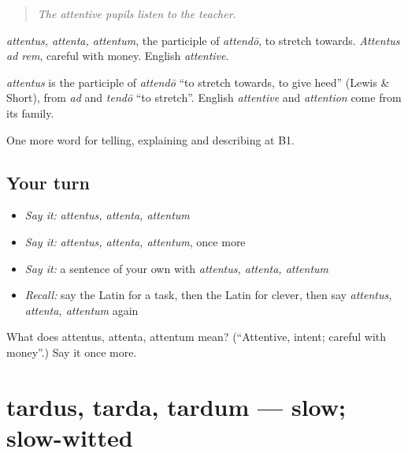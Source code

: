 \begin{quote}
\emph{The attentive pupils listen to the teacher.}
\end{quote}

\emph{attentus, attenta, attentum}, the participle of \emph{attendō}, to stretch towards. \emph{Attentus ad rem}, careful with money. English \emph{attentive}.

\begin{cousinweb}
\emph{attentus} is the participle of \emph{attendō} \textquotedblleft{}to stretch towards, to give heed\textquotedblright{} (Lewis \& Short), from \emph{ad} and \emph{tendō} \textquotedblleft{}to stretch\textquotedblright{}. English \emph{attentive} and \emph{attention} come from its family.
\end{cousinweb}

\begin{grammarlens}[title={What you've built}]
One more word for telling, explaining and describing at B1.
\end{grammarlens}

\subsection*{Your turn}
\begin{itemize}
\raggedright
  \item \emph{Say it:} \emph{attentus, attenta, attentum}
  \item \emph{Say it:} \emph{attentus, attenta, attentum}, once more
  \item \emph{Say it:} a sentence of your own with \emph{attentus, attenta, attentum}
  \item \emph{Recall:} say the Latin for a task, then the Latin for clever, then say \emph{attentus, attenta, attentum} again
\end{itemize}

\begin{tcolorbox}[breakable,colback=teal!4,colframe=teal!35!black,title={Before you move on}]
What does attentus, attenta, attentum mean? (\textquotedblleft{}Attentive, intent; careful with money\textquotedblright{}.) Say it once more.
\end{tcolorbox}
\section[tardus, tarda, tardum]{tardus, tarda, tardum — slow; slow-witted}

\label{lesson:LA-C406-tardus}



